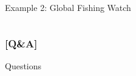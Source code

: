 \documentclass[xcolor=x11names,compress]{beamer}
\renewcommand{\(}{\begin{columns}}
\renewcommand{\)}{\end{columns}}
\newcommand{\<}[1]{\begin{column}{#1}}
\renewcommand{\>}{\end{column}}
\begin{document}
\begin{frame}{Example 2: Global Fishing Watch }
\begin{columns}[T]
\begin{column}{0.4\textwidth}
\begin{center}
\begin{itemize}

   \end{itemize}
    \end{center}
    \end{column}
\end{columns}
\end{frame}



\begin{frame} %
\frametitle{\textcolor{brique}{[Q\&A]}}
\begin{center}
\Large \textcolor{siap}{ Questions}
\end{center}
\end{frame}
\end{document}

